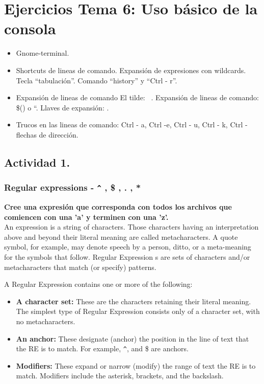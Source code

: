 \documentclass[a4paper,11pt,spanish]{article} %
\begin{document}
\pagebreak

\section{Ejercicios Tema 6: Uso básico de la consola }

\begin{itemize}
 \item Gnome-terminal.
 \item Shortcuts de lineas de comando.
  \subitem Expansión de expresiones con wildcards.
  \subitem Tecla “tabulación”.
  \subitem Comando “history” y “Ctrl - r”.
 \item Expansión de lineas de comando
  \subitem El tilde: ~.
  \subitem Expansión de lineas de comando: \$() o ``.
  \subitem Llaves de expansión: { }.
 \item Trucos en las lineas de comando: Ctrl - a, Ctrl -e, Ctrl - u, Ctrl - k, Ctrl - flechas de dirección.
\end{itemize}


\subsection{Actividad 1.}

\subsubsection{Regular expressions - \texttt{\^} , \$ , . , *}

\textbf{Cree una expresión que corresponda con todos los archivos que comiencen con una 'a' y terminen con una 'z'.}\\

An expression is a string of characters. Those characters having an interpretation above and
beyond their literal meaning are called metacharacters. A quote symbol, for example, may denote
speech by a person, ditto, or a meta-meaning for the symbols that follow. Regular Expression
s are sets of characters and/or metacharacters that match (or specify) patterns.

A Regular Expression contains one or more of the following:

\begin{itemize}
 \item \textbf{A character set:} These are the characters retaining their literal meaning.
 The simplest type of Regular Expression consists only of a character set, with no metacharacters.
 \item \textbf{An anchor:} These designate (anchor) the position in the line of text that the RE 
 is to match. For example, \texttt{\^}, and \$ are anchors.
 \item \textbf{Modifiers:}  These expand or narrow (modify) the range of text the RE is to match.
 Modifiers include the asterisk, brackets, and the backslash.
\end{itemize}
\end{document}
